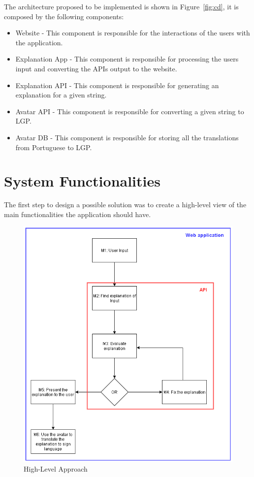 The architecture proposed to be implemented is shown in Figure~\ref{fig:cd}, it is composed by the following components:

\begin{itemize}
    \item Website - This component is responsible for the interactions of the users with the application.
    \item Explanation App - This component is responsible for processing the users input and converting the APIs output to the website.
    \item Explanation API - This component is responsible for generating an explanation for a given string.
    \item Avatar API - This component is responsible for converting a given string to \gls{LGP}.
    \item Avatar DB - This component is responsible for storing all the translations from Portuguese to \gls{LGP}.
\end{itemize}

\section{System Functionalities}

The first step to design a possible solution was to create a high-level view of the main functionalities the application should have.
\begin{figure}[H]
\centering
\includegraphics[scale=0.5]{ch4/assets/diagram1_2.png}
\caption[High-Level Approach]{High-Level Approach}
\label{fig:Diagram1}
\end{figure}

